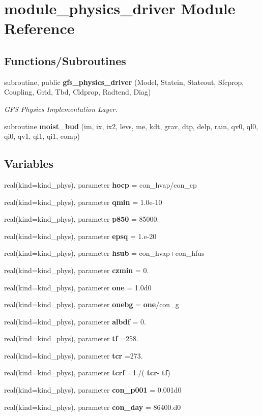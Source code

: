 \section{module\+\_\+physics\+\_\+driver Module Reference}
\label{namespacemodule__physics__driver}
\subsection*{Functions/\+Subroutines}
\textbf{ }\par
\begin{DoxyCompactItemize}
\item 
subroutine, public \textbf{ gfs\+\_\+physics\+\_\+driver} (Model, Statein, Stateout, Sfcprop, Coupling, Grid, Tbd, Cldprop, Radtend, Diag)
\begin{DoxyCompactList}\small\item\em G\+FS Physics Implementation Layer. \end{DoxyCompactList}\item 
subroutine \textbf{ moist\+\_\+bud} (im, ix, ix2, levs, me, kdt, grav, dtp, delp, rain, qv0, ql0, qi0, qv1, ql1, qi1, comp)
\end{DoxyCompactItemize}

\subsection*{Variables}
\begin{DoxyCompactItemize}
\item 
real(kind=kind\+\_\+phys), parameter \textbf{ hocp} = con\+\_\+hvap/con\+\_\+cp
\item 
real(kind=kind\+\_\+phys), parameter \textbf{ qmin} = 1.\+0e-\/10
\item 
real(kind=kind\+\_\+phys), parameter \textbf{ p850} = 85000.
\item 
real(kind=kind\+\_\+phys), parameter \textbf{ epsq} = 1.e-\/20
\item 
real(kind=kind\+\_\+phys), parameter \textbf{ hsub} = con\+\_\+hvap+con\+\_\+hfus
\item 
real(kind=kind\+\_\+phys), parameter \textbf{ czmin} = 0.
\item 
real(kind=kind\+\_\+phys), parameter \textbf{ one} = 1.\+0d0
\item 
real(kind=kind\+\_\+phys), parameter \textbf{ onebg} = \textbf{ one}/con\+\_\+g
\item 
real(kind=kind\+\_\+phys), parameter \textbf{ albdf} = 0.
\item 
real(kind=kind\+\_\+phys), parameter \textbf{ tf} =258.
\item 
real(kind=kind\+\_\+phys), parameter \textbf{ tcr} =273.
\item 
real(kind=kind\+\_\+phys), parameter \textbf{ tcrf} =1./(\textbf{ tcr}-\/\textbf{ tf})
\item 
real(kind=kind\+\_\+phys), parameter \textbf{ con\+\_\+p001} = 0.\+001d0
\item 
real(kind=kind\+\_\+phys), parameter \textbf{ con\+\_\+day} = 86400.d0
\end{DoxyCompactItemize}


